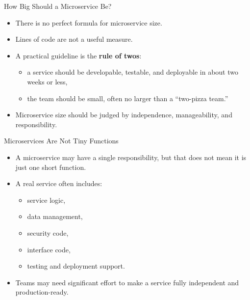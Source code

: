 \begin{frame}{How Big Should a Microservice Be?}
\begin{itemize}
    \item There is no perfect formula for microservice size.
    \item Lines of code are not a useful measure.
    \item A practical guideline is the \textbf{rule of twos}:
    \begin{itemize}
        \item a service should be developable, testable, and deployable in about two weeks or less,
        \item the team should be small, often no larger than a ``two-pizza team.''
    \end{itemize}
    \item Microservice size should be judged by independence, manageability, and responsibility.
\end{itemize}
\end{frame}

\begin{frame}{Microservices Are Not Tiny Functions}
\begin{itemize}
    \item A microservice may have a single responsibility, but that does not mean it is just one short function.
    \item A real service often includes:
    \begin{itemize}
        \item service logic,
        \item data management,
        \item security code,
        \item interface code,
        \item testing and deployment support.
    \end{itemize}
    \item Teams may need significant effort to make a service fully independent and production-ready.
\end{itemize}
\end{frame}

